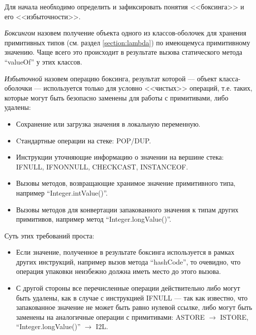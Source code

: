 Для начала необходимо определить и зафиксировать понятия <<боксинга>> и его <<избыточности>>.

\textit{Боксингом} назовем получение объекта одного из классов-оболочек для хранения примитивных
типов (см. раздел \ref{section:lambda}) по имеющемуса примитивному значению.
Чаще всего это происходит в результате вызова статического метода ``valueOf'' у этих классов.

\textit{Избыточной} назовем операцию боксинга, результат которой --- объект класса-оболочки ---
используется только для условно <<чистых>> операций, т.е. таких, которые могут быть
безопасно заменены для работы с примитивами, либо удалены:
\begin{itemize}
    \item Сохранение или загрузка значения в локальную переменную.
    \item Cтандартные операции на стеке: POP/DUP.
    \item Инструкции уточняющие информацию о значении на вершине стека: IFNULL, IFNONNULL,
    CHECKCAST, INSTANCEOF.
    \item Вызовы методов, возвращающие хранимое значение примитивного типа, например
    ``Integer.intValue()''.
    \item Вызовы методов для конвертации запакованного значения к типам других примитивов,
    например метод ``Integer.longValue()''.
\end{itemize}

Суть этих требований проста:
\begin{itemize}
    \item Если значение, полученное в результате боксинга используется в рамках других инструкций,
    например вызов метода ``hashCode'', то очевидно, что операция упаковки неизбежно должна иметь
    место до этого вызова.

    \item С другой стороны все перечисленные операции действительно либо могут быть удалены, как
    в случае с инструкцией IFNULL --- так как известно, что запакованное значение не может быть
    равно нулевой ссылке, либо могут быть заменены на аналогичные операции с примитивами:
    ASTORE $\to$ ISTORE, ``Integer.longValue()'' $\to$ I2L.
\end{itemize}

